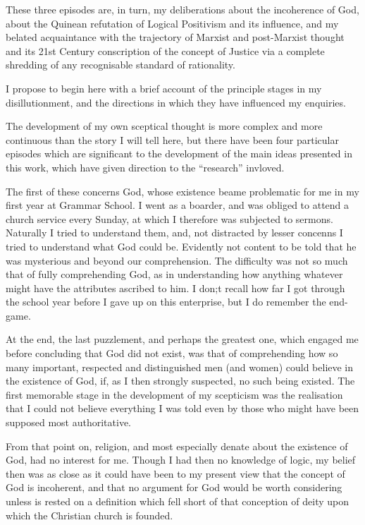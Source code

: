 \documentclass[10pt,titlepage]{book}
\begin{document}
These three episodes are, in turn, my deliberations about the incoherence of God, about the Quinean refutation of Logical Positivism and its influence, and my belated acquaintance with the trajectory of Marxist and post-Marxist thought and its 21st Century conscription of the concept of Justice via a complete shredding of any recognisable standard of rationality.

I propose to begin here with a brief account of the principle stages in my disillutionment, and the directions in which they have influenced my enquiries.

The development of my own sceptical thought is more complex and more continuous than the story I will tell here, but there have been four particular episodes which are significant to the development of the main ideas presented in this work, which have given direction to the ``research'' invloved.

The first of these concerns God, whose existence beame problematic for me in my first year at Grammar School.
I went as a boarder, and was obliged to attend a church service every Sunday, at which I therefore was subjected to sermons.
Naturally I tried to understand them, and, not distracted by lesser concenns I tried to understand what God could be.
Evidently not content to be told that he was mysterious and beyond our comprehension.
The difficulty was not so much that of fully comprehending God, as in understanding how anything whatever might have the attributes ascribed to him.
I don;t recall how far I got through the school year before I gave up on this enterprise, but I do remember the end-game.

At the end, the last puzzlement, and perhaps the greatest one, which engaged me before concluding that God did not exist, was that of comprehending how so many important, respected and distinguished men (and women) could believe in the existence of God, if, as I then strongly suspected, no such being existed.
The first memorable stage in the development of my scepticism was the realisation that I could not believe everything I was told even by those who might have been supposed most authoritative.

From that point on, religion, and most especially denate about the existence of God, had no interest for me.
Though I had then no knowledge of logic, my belief then was as close as it could have been to my present view that the concept of God is incoherent, and that no argument for God would be worth considering unless is rested on a definition which fell short of that conception of deity upon which the Christian church is founded.
\end{document}
